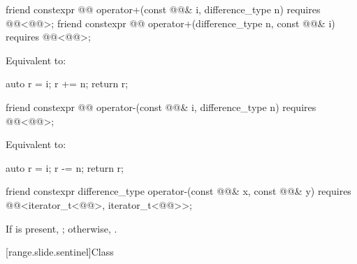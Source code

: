 \begin{itemdecl}
friend constexpr @@ operator+(const @@& i, difference_type n)
  requires @@<@@>;
friend constexpr @@ operator+(difference_type n, const @@& i)
  requires @@<@@>;
\end{itemdecl}

\begin{itemdescr}
\pnum
\effects
Equivalent to:
\begin{codeblock}
auto r = i;
r += n;
return r;
\end{codeblock}
\end{itemdescr}

\begin{itemdecl}
friend constexpr @@ operator-(const @@& i, difference_type n)
  requires @@<@@>;
\end{itemdecl}

\begin{itemdescr}
\pnum
\effects
Equivalent to:
\begin{codeblock}
auto r = i;
r -= n;
return r;
\end{codeblock}
\end{itemdescr}

\begin{itemdecl}
friend constexpr difference_type operator-(const @@& x, const @@& y)
  requires @@<iterator_t<@@>, iterator_t<@@>>;
\end{itemdecl}

\begin{itemdescr}
\pnum
\returns
If  is present,
;
otherwise, .
\end{itemdescr}

[range.slide.sentinel]{Class }

